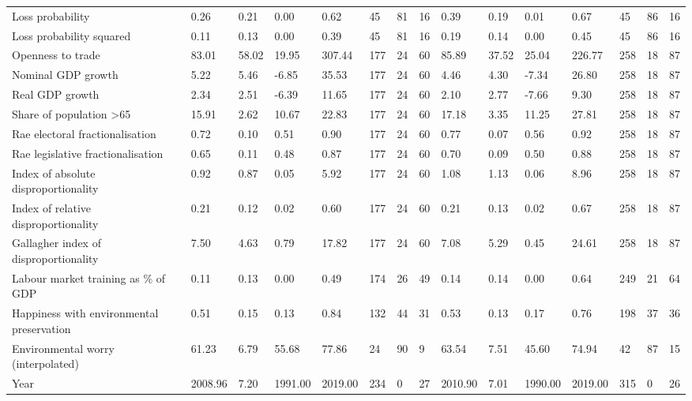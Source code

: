 \begin{longtable}{lllllllllllllll}
\addlinespace
Loss probability & 0.26 & 0.21 & 0.00 & 0.62 & 45 & 81 & 16 & 0.39 & 0.19 & 0.01 & 0.67 & 45 & 86 & 16\\
Loss probability squared & 0.11 & 0.13 & 0.00 & 0.39 & 45 & 81 & 16 & 0.19 & 0.14 & 0.00 & 0.45 & 45 & 86 & 16\\
Openness to trade & 83.01 & 58.02 & 19.95 & 307.44 & 177 & 24 & 60 & 85.89 & 37.52 & 25.04 & 226.77 & 258 & 18 & 87\\
Nominal GDP growth & 5.22 & 5.46 & -6.85 & 35.53 & 177 & 24 & 60 & 4.46 & 4.30 & -7.34 & 26.80 & 258 & 18 & 87\\
Real GDP growth & 2.34 & 2.51 & -6.39 & 11.65 & 177 & 24 & 60 & 2.10 & 2.77 & -7.66 & 9.30 & 258 & 18 & 87\\
\addlinespace
Share of population >65 & 15.91 & 2.62 & 10.67 & 22.83 & 177 & 24 & 60 & 17.18 & 3.35 & 11.25 & 27.81 & 258 & 18 & 87\\
Rae electoral fractionalisation & 0.72 & 0.10 & 0.51 & 0.90 & 177 & 24 & 60 & 0.77 & 0.07 & 0.56 & 0.92 & 258 & 18 & 87\\
Rae legislative fractionalisation & 0.65 & 0.11 & 0.48 & 0.87 & 177 & 24 & 60 & 0.70 & 0.09 & 0.50 & 0.88 & 258 & 18 & 87\\
Index of absolute disproportionality & 0.92 & 0.87 & 0.05 & 5.92 & 177 & 24 & 60 & 1.08 & 1.13 & 0.06 & 8.96 & 258 & 18 & 87\\
Index of relative disproportionality & 0.21 & 0.12 & 0.02 & 0.60 & 177 & 24 & 60 & 0.21 & 0.13 & 0.02 & 0.67 & 258 & 18 & 87\\
\addlinespace
Gallagher index of disproportionality & 7.50 & 4.63 & 0.79 & 17.82 & 177 & 24 & 60 & 7.08 & 5.29 & 0.45 & 24.61 & 258 & 18 & 87\\
Labour market training as \% of GDP & 0.11 & 0.13 & 0.00 & 0.49 & 174 & 26 & 49 & 0.14 & 0.14 & 0.00 & 0.64 & 249 & 21 & 64\\
Happiness with environmental preservation & 0.51 & 0.15 & 0.13 & 0.84 & 132 & 44 & 31 & 0.53 & 0.13 & 0.17 & 0.76 & 198 & 37 & 36\\
Environmental worry (interpolated) & 61.23 & 6.79 & 55.68 & 77.86 & 24 & 90 & 9 & 63.54 & 7.51 & 45.60 & 74.94 & 42 & 87 & 15\\
Year & 2008.96 & 7.20 & 1991.00 & 2019.00 & 234 & 0 & 27 & 2010.90 & 7.01 & 1990.00 & 2019.00 & 315 & 0 & 26\\
\bottomrule
\end{longtable}
